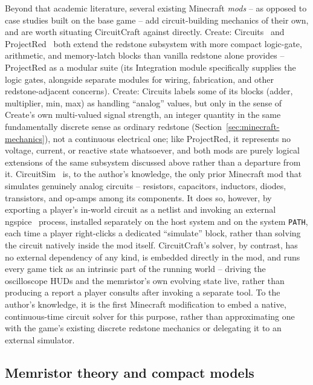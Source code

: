 Beyond that academic literature, several existing Minecraft \emph{mods} -- as opposed to
case studies built on the base game -- add circuit-building mechanics of their own, and are
worth situating CircuitCraft against directly. Create: Circuits~\cite{chocoboyy2026createcircuits}
and ProjectRed~\cite{mrtjp2026projectred} both extend the redstone subsystem with more
compact logic-gate, arithmetic, and memory-latch blocks than vanilla redstone alone provides
-- ProjectRed as a modular suite (its Integration module specifically supplies the logic
gates, alongside separate modules for wiring, fabrication, and other redstone-adjacent
concerns). Create: Circuits labels some of its blocks (adder, multiplier, min, max) as
handling ``analog'' values, but only in the sense of Create's own multi-valued signal
strength, an integer quantity in the same fundamentally discrete sense as ordinary redstone
(Section~\ref{sec:minecraft-mechanics}), not a continuous electrical one; like ProjectRed, it
represents no voltage, current, or reactive state whatsoever, and both mods are purely
logical extensions of the same subsystem discussed above rather than a departure from it.
CircuitSim~\cite{dankov2026circuitsim} is, to the author's knowledge, the only prior
Minecraft mod that simulates genuinely analog circuits -- resistors, capacitors, inductors,
diodes, transistors, and op-amps among its components. It does so, however, by exporting a
player's in-world circuit as a netlist and invoking an external ngspice~\cite{nagel1973spice}
process, installed separately on the host system and on the system \texttt{PATH}, each time a
player right-clicks a dedicated ``simulate'' block, rather than solving the circuit natively
inside the mod itself. CircuitCraft's solver, by contrast, has no external dependency of any
kind, is embedded directly in the mod, and runs every game tick as an intrinsic part of the
running world -- driving the oscilloscope HUDs and the memristor's own evolving state live,
rather than producing a report a player consults after invoking a separate tool. To the
author's knowledge, it is the first Minecraft modification to embed a native, continuous-time
circuit solver for this purpose, rather than approximating one with the game's existing
discrete redstone mechanics or delegating it to an external simulator.

\subsection{Memristor theory and compact models}

